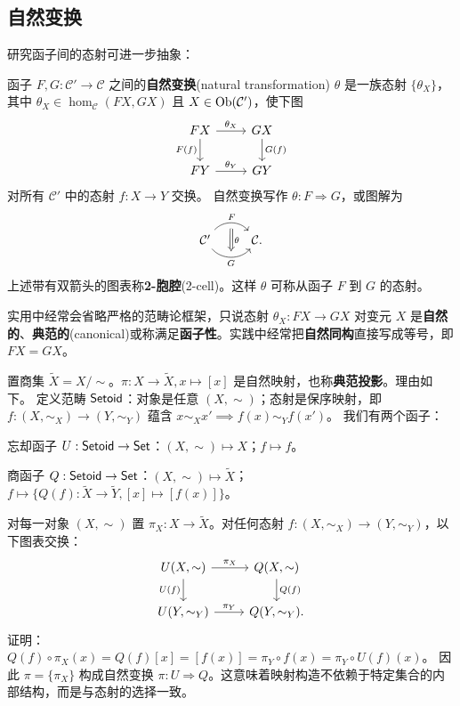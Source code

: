 
\subsection{自然变换}
研究函子间的态射可进一步抽象：
\begin{definition}
    函子 $F, G: \mathcal{C}' \to \mathcal{C}$ 之间的\textbf{自然变换}(natural transformation) $\theta$ 是一族态射 $\{\theta_X\}$，其中 $\theta_X \in \hom_{\mathcal{C}}(FX, GX)$ 且 $X \in \operatorname{Ob}(\mathcal{C}')$，使下图
    \begin{equation}\begin{tikzcd}
        FX \arrow[r, "\theta_X"] \ar[d, "F(f)"'] & GX \arrow[d, "G(f)"] \\
        FY \arrow[r, "\theta_Y"] & GY
    \end{tikzcd}\end{equation}
	对所有 $\mathcal{C}'$ 中的态射 $f: X \to Y$ 交换。
    自然变换写作 $\theta: F \Rightarrow G$，或图解为
    \[ \begin{tikzcd}
        \mathcal{C}' \arrow[bend left=50, r, "F", ""' name=U] \arrow[bend right=50, r, "G"', "" name=D] & \arrow[Rightarrow, to path=(U) -- (D) \tikztonodes, "\theta"] \mathcal{C}.
    \end{tikzcd} \]
    上述带有双箭头的图表称\textbf{2-胞腔}(2-cell)。这样 $\theta$ 可称从函子 $F$ 到 $G$ 的态射。
\end{definition}


实用中经常会省略严格的范畴论框架，只说态射 $\theta_X: FX \to GX$ 对变元 $X$ 是\textbf{自然的}、\textbf{典范的}(canonical)或称满足\textbf{函子性}。实践中经常把\textbf{自然同构}直接写成等号，即 $F X= G X$。

\begin{example}
	置商集 $\tilde X = X/\sim$。$\pi: X \to \tilde X,x\mapsto [x]$ 是自然映射，也称\textbf{典范投影}。理由如下。
	定义范畴 $\mathsf{Setoid}$：对象是任意 $(X, \sim)$；态射是保序映射，即 $f: (X, \sim_X) \to (Y, \sim_Y)$ 蕴含 $x \sim_X x' \implies f(x) \sim_Y f(x')$。
	我们有两个函子：
	\begin{compactitem}
		\item 忘却函子 $U: \mathsf{Setoid} \to \mathsf{Set}$：$(X, \sim) \mapsto X$；$f \mapsto f$。
		\item 商函子 $Q: \mathsf{Setoid} \to \mathsf{Set}$：$(X, \sim) \mapsto \tilde X$；$f \mapsto \{Q(f): \tilde X \to \tilde Y, [x] \mapsto [f(x)] \}$。
	\end{compactitem}
	对每一对象 $(X, \sim)$ 置 $\pi_X: X \to \tilde X$。对任何态射 $f: (X, \sim_X) \to (Y, \sim_Y)$，以下图表交换：
	\begin{equation}\begin{tikzcd}
        U(X, \sim) \arrow[r, "\pi_X"] \ar[d, "U(f)"'] & Q(X, \sim) \arrow[d, "Q(f)"] \\
        U(Y, \sim_Y) \arrow[r, "\pi_Y"] & Q(Y, \sim_Y).
    \end{tikzcd}\end{equation}
	证明：$Q(f)\circ\pi_X(x)=Q(f)[x]=[f(x)]=\pi_Y \circ f(x)=\pi_Y \circ U(f)(x)$。
	因此 $\pi = \{\pi_X\}$ 构成自然变换 $\pi: U \Rightarrow Q$。这意味着映射构造不依赖于特定集合的内部结构，而是与态射的选择一致。
\end{example}

